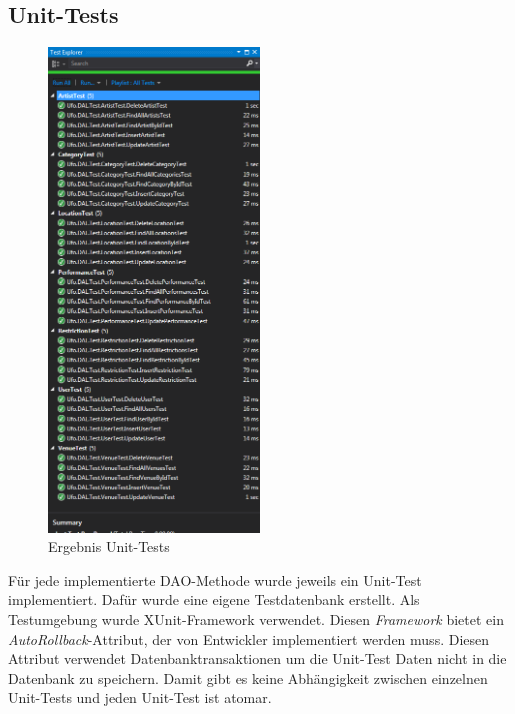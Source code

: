 \documentclass[12pt, a4paper]{article}
\begin{document}
\subsection{Unit-Tests}

\begin{figure}[h] 	
	\centering
		\includegraphics[width=0.5\textwidth]{UnitTests.png}
	\caption{Ergebnis Unit-Tests}
\end{figure}


Für jede implementierte DAO-Methode wurde jeweils ein Unit-Test implementiert. Dafür wurde eine eigene Testdatenbank erstellt. Als Testumgebung wurde XUnit-Framework verwendet. Diesen \textit{Framework} bietet ein \textit{AutoRollback}-Attribut, der von Entwickler implementiert werden muss. Diesen Attribut verwendet Datenbanktransaktionen um die Unit-Test Daten nicht in die Datenbank zu speichern. Damit gibt es keine Abhängigkeit zwischen einzelnen Unit-Tests und jeden Unit-Test ist atomar.

\clearpage 

\end{document}
